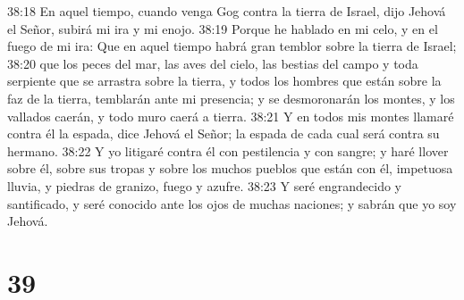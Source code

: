 38:18 En aquel tiempo, cuando venga Gog contra la tierra de Israel, dijo Jehová el Señor, subirá mi ira y mi enojo.  
38:19 Porque he hablado en mi celo, y en el fuego de mi ira: Que en aquel tiempo habrá gran temblor sobre la tierra de Israel; 
38:20 que los peces del mar, las aves del cielo, las bestias del campo y toda serpiente que se arrastra sobre la tierra, y todos los hombres que están sobre la faz de la tierra, temblarán ante mi presencia; y se desmoronarán los montes, y los vallados caerán, y todo muro caerá a tierra.  
38:21 Y en todos mis montes llamaré contra él la espada, dice Jehová el Señor; la espada de cada cual será contra su hermano.  
38:22 Y yo litigaré contra él con pestilencia y con sangre; y haré llover sobre él, sobre sus tropas y sobre los muchos pueblos que están con él, impetuosa lluvia, y piedras de granizo, fuego y azufre.  
38:23 Y seré engrandecido y santificado, y seré conocido ante los ojos de muchas naciones; y sabrán que yo soy Jehová.  

\chapter{39}

